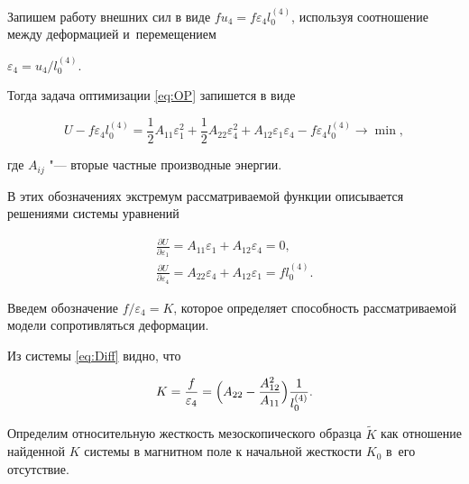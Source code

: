 Запишем работу внешних сил в виде $fu_4=f\varepsilon_4 l_0^{(4)}$, используя соотношение между деформацией и~перемещением 

$\varepsilon_4=u_4/l_0^{(4)}$. 

Тогда  задача оптимизации \eqref{eq:OP} запишется в виде

\begin{equation}

\label{eq:U_series_2}%

U - f\varepsilon_4 l_0^{(4)} = \frac{1}{2} A_{11} \varepsilon_1^2 + \frac{1}{2} A_{22} \varepsilon_4^2 +  A_{12} \varepsilon_1 \varepsilon_4 - f\varepsilon_4 l_0^{(4)} \to \min,

\end{equation}

где $A_{ij}$ "--- вторые частные производные энергии.

В этих обозначениях экстремум рассматриваемой функции описывается решениями системы уравнений

\begin{equation}

\label{eq:Diff}%

\begin{array}{l}

\displaystyle

\frac{\partial U}{\partial \varepsilon_1} = A_{11} \varepsilon_1 + A_{12} \varepsilon_4 = 0, \\[3mm]

\displaystyle

\frac{\partial U}{\partial \varepsilon_4} = A_{22} \varepsilon_4 + A_{12} \varepsilon_1 = f l_0^{(4)}.

\end{array}

\end{equation}



Введем обозначение $f/\varepsilon_4=K$, которое определяет способность рассматриваемой модели сопротивляться деформации. 

Из системы \eqref{eq:Diff} видно, что 

\begin{equation}

\label{eq:K}%

K=\frac{f}{\varepsilon_4} = \Bigl( A_{22} - \frac{A_{12}^2}{A_{11}} \Bigr) \frac{1}{l_0^{(4)}}.

\end{equation}

Определим относительную жесткость мезоскопического образца $\tilde K$ как отношение найденной $K$ системы в магнитном поле к начальной жесткости $K_0$ в~его отсутствие. 



